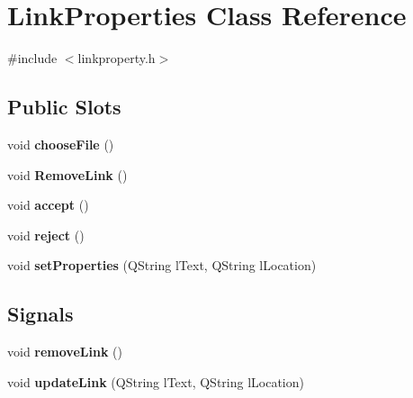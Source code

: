 \hypertarget{classLinkProperties}{
\section{LinkProperties Class Reference}
\label{classLinkProperties}
}


{\ttfamily \#include $<$linkproperty.h$>$}

\subsection*{Public Slots}
\begin{DoxyCompactItemize}
\item 
\hypertarget{classLinkProperties_a61f46862d11a36b2928130090333b2fc}{
void {\bfseries chooseFile} ()}
\label{classLinkProperties_a61f46862d11a36b2928130090333b2fc}

\item 
\hypertarget{classLinkProperties_aa38f961f1a77930275977c3f439585ab}{
void {\bfseries RemoveLink} ()}
\label{classLinkProperties_aa38f961f1a77930275977c3f439585ab}

\item 
\hypertarget{classLinkProperties_a08f935dc84c90062dc4b8df50c969eab}{
void {\bfseries accept} ()}
\label{classLinkProperties_a08f935dc84c90062dc4b8df50c969eab}

\item 
\hypertarget{classLinkProperties_a213cf2437f754c43cfd6972495438271}{
void {\bfseries reject} ()}
\label{classLinkProperties_a213cf2437f754c43cfd6972495438271}

\item 
\hypertarget{classLinkProperties_ab54fb0d15212481bccb5166893024577}{
void {\bfseries setProperties} (QString lText, QString lLocation)}
\label{classLinkProperties_ab54fb0d15212481bccb5166893024577}

\end{DoxyCompactItemize}
\subsection*{Signals}
\begin{DoxyCompactItemize}
\item 
\hypertarget{classLinkProperties_a29b41553d4a1f66a7f9855dfb09651b6}{
void {\bfseries removeLink} ()}
\label{classLinkProperties_a29b41553d4a1f66a7f9855dfb09651b6}

\item 
\hypertarget{classLinkProperties_ad3e7913953dd88f1e8e323118fe75245}{
void {\bfseries updateLink} (QString lText, QString lLocation)}
\label{classLinkProperties_ad3e7913953dd88f1e8e323118fe75245}

\end{DoxyCompactItemize}
